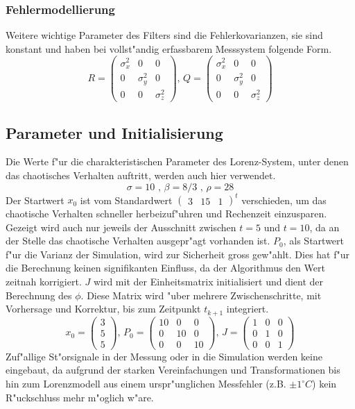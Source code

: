 \begin{refsection}
\subsubsection{Fehlermodellierung}
Weitere wichtige Parameter des Filters sind die Fehlerkovarianzen, sie sind konstant und haben bei vollst"andig erfassbarem Messsystem folgende Form.
\[R=\begin{pmatrix}
\sigma^{2}_{x} & 0 & 0 \\ 
0 & \sigma^{2}_{y} & 0 \\ 
0 & 0 & \sigma^{2}_{z}
\end{pmatrix}  \text{, }
Q=\begin{pmatrix}
\sigma^{2}_{x} & 0 & 0 \\ 
0 & \sigma^{2}_{y} & 0 \\ 
0 & 0 & \sigma^{2}_{z}
\end{pmatrix} 
\]

\subsection{Parameter und Initialisierung}
Die Werte f"ur die charakteristischen Parameter des Lorenz-System, unter denen das chaotisches Verhalten auftritt, werden auch hier verwendet.
\[
\sigma=10 \text{ , } \beta=8/3 \text{ , }\rho=28
\]
Der Startwert $x_{0}$ ist vom Standardwert $\begin{pmatrix}
3 & 15 & 1
\end{pmatrix}^{t}$ verschieden, um das chaotische Verhalten schneller herbeizuf"uhren und Rechenzeit einzusparen. Gezeigt wird auch nur jeweils der Ausschnitt zwischen $t = 5$ und $t=10$, da an der Stelle das chaotische Verhalten ausgepr"agt vorhanden ist. $P_{0}$, als Startwert f"ur die Varianz der Simulation, wird zur Sicherheit gross gew"ahlt. Dies hat f"ur die Berechnung keinen signifikanten Einfluss, da der Algorithmus den Wert zeitnah korrigiert. $J$ wird mit der Einheitsmatrix initialisiert und dient der Berechnung des $\phi$. Diese Matrix wird "uber mehrere Zwischenschritte, mit Vorhersage und Korrektur, bis zum Zeitpunkt $t_{k+1}$ integriert.
\[x_{0}=\begin{pmatrix}
3 \\ 
5 \\ 
5
\end{pmatrix} 
\text{, }
P_{0}=\begin{pmatrix}
10 & 0 & 0 \\ 
0 & 10 & 0 \\ 
0 & 0 & 10
\end{pmatrix} 
\text{, }
J=\begin{pmatrix}
1 & 0 & 0 \\ 
0 & 1 & 0 \\ 
0 & 0 & 1
\end{pmatrix} 
\]
Zuf"allige St"orsignale in der Messung oder in die Simulation werden keine eingebaut, da aufgrund der starken Vereinfachungen und Transformationen bis hin zum Lorenzmodell aus einem urspr"unglichen Messfehler (z.B. $\pm1^\circ C$) kein R"uckschluss mehr m"oglich w"are.



\end{refsection}
